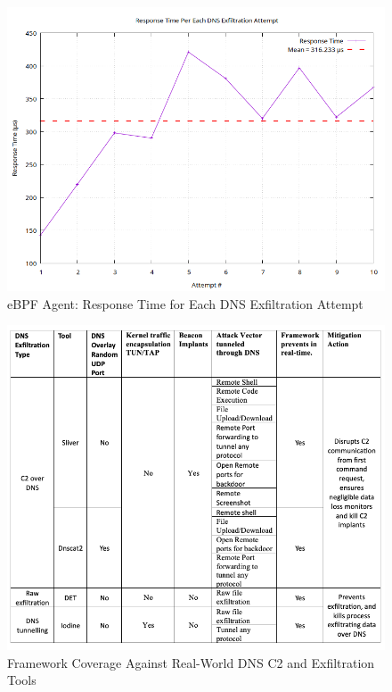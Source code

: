 \documentclass[letterpaper,twocolumn,10pt]{article}
\begin{document}
\begin{figure}[t]
  \centering
  \includegraphics[width=\linewidth]{images/results/response_speed/response_speed.png}
  \caption{eBPF Agent: Response Time for Each DNS Exfiltration Attempt}
  \label{fig:response_speed}
\end{figure}



\begin{figure}[t]
  \centering
  \includegraphics[width=0.85\linewidth]{images/results/C2_exfil_strength.png}
  \caption{Framework Coverage Against Real-World DNS C2 and Exfiltration Tools}
  \label{tab:dns-framework-coverage}
\end{figure}

\end{document}
